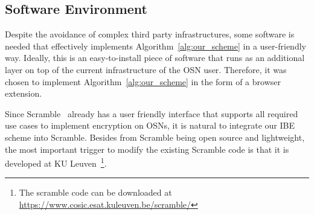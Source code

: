 \subsection{Software Environment}
Despite the avoidance of complex third party infrastructures, some software is needed that effectively implements Algorithm~\ref{alg:our_scheme} in a user-friendly way. Ideally, this is an easy-to-install piece of software that runs as an additional layer on top of the current infrastructure of the OSN user. Therefore, it was chosen to implement Algorithm~\ref{alg:our_scheme} in the form of a browser extension.

Since Scramble~\cite{art:BeatoKW11} already has a user friendly interface that supports all required use cases to implement encryption on OSNs, it is natural to integrate our IBE scheme into Scramble. Besides from Scramble being open source and lightweight, the most important trigger to modify the existing Scramble code is that it is developed at KU Leuven~\footnote{The scramble code can be downloaded at \url{https://www.cosic.esat.kuleuven.be/scramble/}}.

